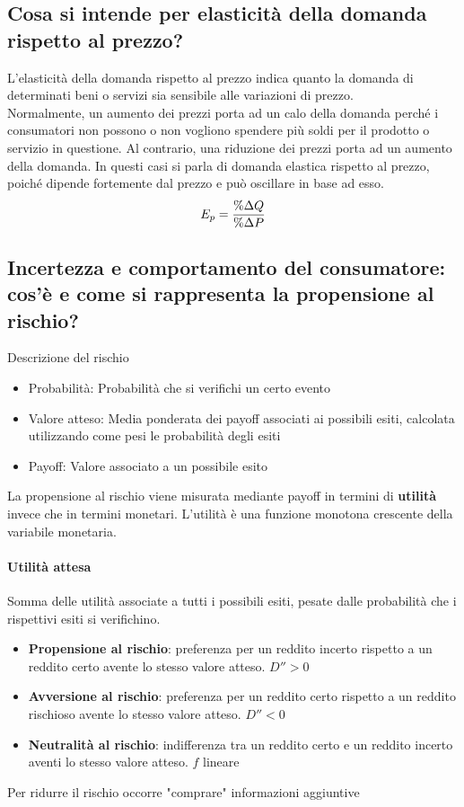 \documentclass[12pt]{article}
\begin{document}
\subsection{Cosa si intende per elasticità della domanda rispetto al prezzo?}
L’elasticità della domanda rispetto al prezzo indica quanto la domanda di determinati beni o servizi sia sensibile alle variazioni di prezzo.\\
Normalmente, un aumento dei prezzi porta ad un calo della domanda perché i consumatori non possono o non vogliono spendere più soldi per il prodotto o servizio in questione. Al contrario, una riduzione dei prezzi porta ad un aumento della domanda. In questi casi si parla di domanda elastica rispetto al prezzo, poiché dipende fortemente dal prezzo e può oscillare in base ad esso.
$$E_p={\% \Delta Q \over{\% \Delta P }}$$

\newpage
\subsection{Incertezza e comportamento del consumatore: cos'è e come si rappresenta la propensione al rischio?}
Descrizione del rischio
\begin{itemize}
    \item Probabilità: Probabilità che si verifichi un certo evento
    \item Valore atteso: Media ponderata dei payoff associati ai possibili esiti, calcolata utilizzando come pesi le probabilità degli esiti
    \item Payoff: Valore associato a un possibile esito
\end{itemize}
La propensione al rischio viene misurata mediante payoff in termini di \textbf{utilità} invece che in termini monetari. L’utilità è una funzione
monotona crescente della variabile monetaria.
\paragraph{Utilità attesa} Somma delle utilità associate a tutti i possibili esiti, pesate dalle probabilità
che i rispettivi esiti si verifichino.
\begin{itemize}
    \item \textbf{Propensione al rischio}: preferenza per un reddito incerto rispetto a un reddito certo avente lo stesso valore atteso. $D'' > 0$
    \item \textbf{Avversione al rischio}: preferenza per un reddito certo rispetto a un reddito rischioso avente lo stesso valore atteso. $D'' < 0$
    \item \textbf{Neutralità al rischio}: indifferenza tra un reddito certo e un reddito incerto aventi lo stesso valore atteso. $f$ lineare
\end{itemize}
Per ridurre il rischio occorre "comprare" informazioni aggiuntive
\newpage
\end{document}

